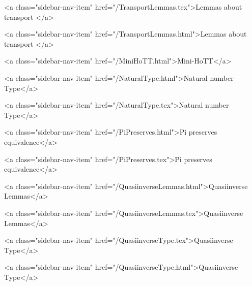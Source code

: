       
    
      
        
          <a class="sidebar-nav-item" href="/TransportLemmas.tex">Lemmas about transport </a>
        
      
    
      
        
          <a class="sidebar-nav-item" href="/TransportLemmas.html">Lemmas about transport </a>
        
      
    
      
        
          <a class="sidebar-nav-item" href="/MiniHoTT.html">Mini-HoTT</a>
        
      
    
      
        
          <a class="sidebar-nav-item" href="/NaturalType.html">Natural number Type</a>
        
      
    
      
        
          <a class="sidebar-nav-item" href="/NaturalType.tex">Natural number Type</a>
        
      
    
      
        
          <a class="sidebar-nav-item" href="/PiPreserves.html">Pi preserves equivalence</a>
        
      
    
      
        
          <a class="sidebar-nav-item" href="/PiPreserves.tex">Pi preserves equivalence</a>
        
      
    
      
        
          <a class="sidebar-nav-item" href="/QuasiinverseLemmas.html">Quasiinverse Lemmas</a>
        
      
    
      
        
          <a class="sidebar-nav-item" href="/QuasiinverseLemmas.tex">Quasiinverse Lemmas</a>
        
      
    
      
        
          <a class="sidebar-nav-item" href="/QuasiinverseType.tex">Quasiinverse Type</a>
        
      
    
      
        
          <a class="sidebar-nav-item" href="/QuasiinverseType.html">Quasiinverse Type</a>
        
